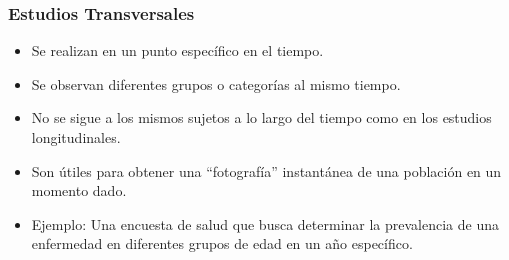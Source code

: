 \documentclass[aspectratio=169]{beamer}
\begin{document}
\begin{frame}
\frametitle{Estudios Transversales}
\begin{itemize}
    \item Se realizan en un punto específico en el tiempo.
    \item Se observan diferentes grupos o categorías al mismo tiempo.
    \item No se sigue a los mismos sujetos a lo largo del tiempo como en los estudios longitudinales.
    \item Son útiles para obtener una ``fotografía'' instantánea de una población en un momento dado.
    \item Ejemplo: Una encuesta de salud que busca determinar la prevalencia de una enfermedad en diferentes grupos de edad en un año específico.
\end{itemize}
\end{frame}








\end{document}
